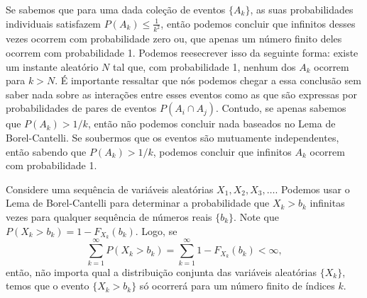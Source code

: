 %
\begin{frame}
%
%
\begin{exem}
Se sabemos que para uma dada coleção de eventos $\{A_k\}$, as suas probabilidades individuais satisfazem $P(A_k)\leq \frac{1}{k^2}$, então podemos concluir que infinitos desses vezes ocorrem com probabilidade zero ou, que apenas um número finito deles ocorrem com probabilidade 1. Podemos reesecrever isso da seguinte forma: existe um instante aleatório $N$ tal que, com probabilidade 1, nenhum dos $A_k$ ocorrem para $k>N$. É importante ressaltar que nós podemos chegar a essa conclusão sem saber nada sobre as interações entre esses eventos como as que são expressas por probabilidades de pares de eventos $P(A_i\cap A_j)$. Contudo, se apenas sabemos que $P(A_k)>1/k$, então não podemos concluir nada baseados no Lema de Borel-Cantelli. Se soubermos que os eventos são mutuamente independentes, então sabendo que $P(A_k)>1/k$, podemos concluir que infinitos $A_k$ ocorrem com probabilidade 1.
\end{exem}
%
%
%
%
\begin{exem}
Considere uma sequência de variáveis aleatórias $X_1,X_2,X_3,\ldots$. Podemos usar o Lema de Borel-Cantelli para determinar a probabilidade que $X_k>b_k$ infinitas vezes para qualquer sequência de números reais $\{b_k\}$. Note que
$P(X_k>b_k)=1-F_{X_k}(b_k)$. Logo, se
$$\sum_{k=1}^{\infty}P(X_k>b_k)=\sum_{k=1}^{\infty}1-F_{X_k}(b_k)<\infty,$$
então, não importa qual a distribuição conjunta das variáveis aleatórias $\{X_k\}$, temos que o evento $\{X_k>b_k\}$ só ocorrerá para um número finito de índices $k$. 
\end{exem}
\end{frame}


